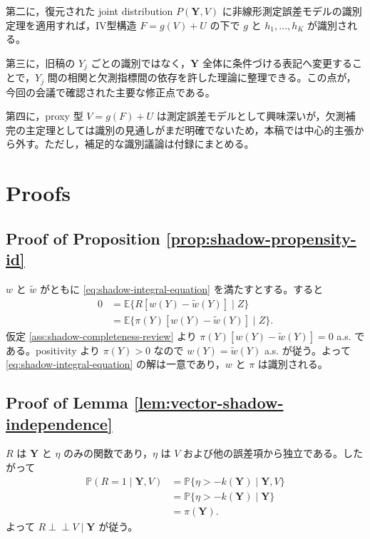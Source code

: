 \documentclass[10pt,a4paper]{article}
\newcommand{\indep}{\mathrel{\perp\!\!\!\perp}}
\newcommand{\E}{\mathbb{E}}
\newcommand{\Prb}{\mathbb{P}}
\newcommand{\1}{\mathbf{1}}
\newcommand{\Y}{\bm{Y}}
\begin{document}
第二に，復元された joint distribution $P(\Y,V)$ に非線形測定誤差モデルの識別定理を適用すれば，IV型構造 $F=g(V)+U$ の下で $g$ と $h_1,\ldots,h_K$ が識別される。

第三に，旧稿の $Y_j$ ごとの識別ではなく，$\Y$ 全体に条件づける表記へ変更することで，$Y_j$ 間の相関と欠測指標間の依存を許した理論に整理できる。この点が，今回の会議で確認された主要な修正点である。

第四に，proxy 型 $V=g(F)+U$ は測定誤差モデルとして興味深いが，欠測補完の主定理としては識別の見通しがまだ明確でないため，本稿では中心的主張から外す。ただし，補足的な識別議論は付録にまとめる。

\appendix

\section{Proofs}

\subsection{Proof of Proposition \ref{prop:shadow-propensity-id}}
$w$ と $\widetilde w$ がともに \eqref{eq:shadow-integral-equation} を満たすとする。すると
\begin{align}
0
&=\E\{R[w(Y)-\widetilde w(Y)]\mid Z\}\\
&=\E\{\pi(Y)[w(Y)-\widetilde w(Y)]\mid Z\}.
\end{align}
仮定 \ref{ass:shadow-completeness-review} より $\pi(Y)[w(Y)-\widetilde w(Y)]=0$ a.s. である。positivity より $\pi(Y)>0$ なので $w(Y)=\widetilde w(Y)$ a.s. が従う。よって \eqref{eq:shadow-integral-equation} の解は一意であり，$w$ と $\pi$ は識別される。

\subsection{Proof of Lemma \ref{lem:vector-shadow-independence}}
$R$ は $\Y$ と $\eta$ のみの関数であり，$\eta$ は $V$ および他の誤差項から独立である。したがって
\begin{align}
  \Prb(R=1\mid \Y,V)
  &=\Prb\{\eta>-k(\Y)\mid \Y,V\}\\
  &=\Prb\{\eta>-k(\Y)\mid \Y\}\\
  &=\pi(\Y).
\end{align}
よって $R\indep V\mid \Y$ が従う。
\end{document}
